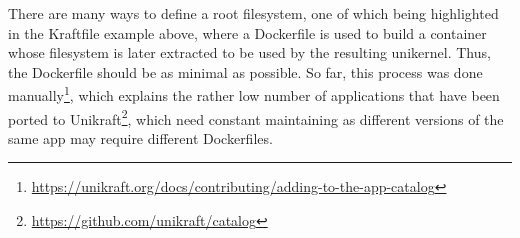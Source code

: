 There are many ways to define a root filesystem, one of which being highlighted in the Kraftfile example above, where a Dockerfile is used to build a container whose filesystem is later extracted to be used
by the resulting unikernel. Thus, the Dockerfile should be as minimal as possible. So far, this process was done manually\footnote{
    \url{https://unikraft.org/docs/contributing/adding-to-the-app-catalog}
}, which explains the rather low number of applications that have been ported to Unikraft\footnote{
    \url{https://github.com/unikraft/catalog}
}, which need constant maintaining as different versions of the same app may require different Dockerfiles. 